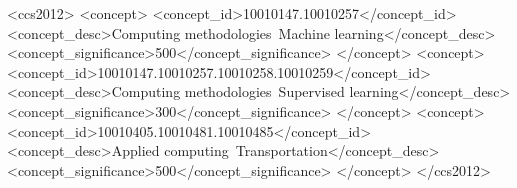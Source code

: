 \documentclass[sigconf,nonacm]{acmart}
\begin{document}
\begin{CCSXML}
<ccs2012>
   <concept>
       <concept_id>10010147.10010257</concept_id>
       <concept_desc>Computing methodologies~Machine learning</concept_desc>
       <concept_significance>500</concept_significance>
   </concept>
   <concept>
       <concept_id>10010147.10010257.10010258.10010259</concept_id>
       <concept_desc>Computing methodologies~Supervised learning</concept_desc>
       <concept_significance>300</concept_significance>
   </concept>
   <concept>
       <concept_id>10010405.10010481.10010485</concept_id>
       <concept_desc>Applied computing~Transportation</concept_desc>
       <concept_significance>500</concept_significance>
   </concept>
</ccs2012>
\end{CCSXML}



\maketitle






\end{document}

